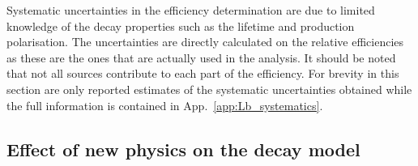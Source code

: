 %
Systematic uncertainties in the efficiency determination are due to limited knowledge
of the decay properties such as the \Lb lifetime and production polarisation.
The uncertainties are directly calculated on the relative efficiencies as these are the ones that
are actually used in the analysis. It should be noted that not all sources contribute to each part
of the efficiency. For brevity in this section are only reported estimates of the systematic
uncertainties obtained while the full information is contained in App.~\ref{app:Lb_systematics}.
%

\subsection{Effect of new physics on the decay model}
\label{sec:WCvariation}

